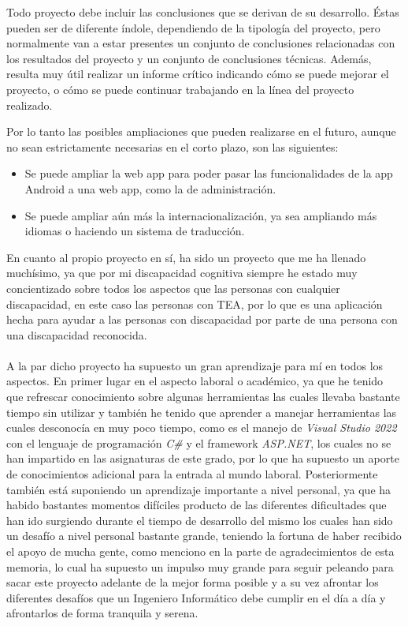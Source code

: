 
Todo proyecto debe incluir las conclusiones que se derivan de su desarrollo.
Éstas pueden ser de diferente índole, dependiendo de la tipología del proyecto,
pero normalmente van a estar presentes un conjunto de conclusiones relacionadas
con los resultados del proyecto y un conjunto de conclusiones técnicas. Además,
resulta muy útil realizar un informe crítico indicando cómo se puede mejorar el
proyecto, o cómo se puede continuar trabajando en la línea del proyecto
realizado. 

Por lo tanto las posibles ampliaciones que pueden realizarse en el futuro,
aunque no sean estrictamente necesarias en el corto plazo, son las siguientes:
\begin{itemize}
    \item Se puede ampliar la web app para poder pasar las funcionalidades de la
    app Android a una web app, como la de administración.
    \item Se puede ampliar aún más la internacionalización, ya sea ampliando más
    idiomas o haciendo un sistema de traducción.
\end{itemize}

En cuanto al propio proyecto en sí, ha sido un proyecto que me ha llenado
muchísimo, ya que por mi discapacidad cognitiva siempre he estado muy
concientizado sobre todos los aspectos que las personas con cualquier
discapacidad, en este caso las personas con TEA, por lo que es una aplicación
hecha para ayudar a las personas con discapacidad por parte de una persona con
una discapacidad reconocida.\\
\\
A la par dicho proyecto ha supuesto un gran aprendizaje para mí en todos los
aspectos. En primer lugar en el aspecto laboral o académico, ya que he tenido
que refrescar conocimiento sobre algunas herramientas las cuales llevaba
bastante tiempo sin utilizar y también he tenido que aprender a manejar
herramientas las cuales desconocía en muy poco tiempo, como es el manejo de
\textit{Visual Studio 2022} con el lenguaje de programación \textit{C\#} y el
framework \textit{ASP.NET}, los cuales no se han impartido en las asignaturas de
este grado, por lo que ha supuesto un aporte de conocimientos adicional para la
entrada al mundo laboral. Posteriormente también está suponiendo un aprendizaje
importante a nivel personal, ya que ha habido bastantes momentos difíciles
producto de las diferentes dificultades que han ido surgiendo durante el tiempo
de desarrollo del mismo los cuales han sido un desafío a nivel personal bastante
grande, teniendo la fortuna de haber recibido el apoyo de mucha gente, como
menciono en la parte de agradecimientos de esta memoria, lo cual ha supuesto un
impulso muy grande para seguir peleando para sacar este proyecto adelante de la
mejor forma posible y a su vez afrontar los diferentes desafíos que un Ingeniero
Informático debe cumplir en el día a día y afrontarlos de forma tranquila y
serena.
